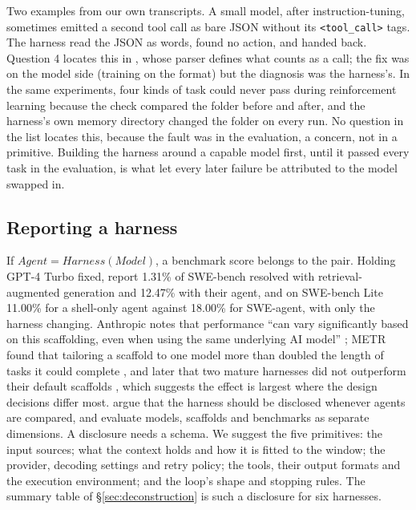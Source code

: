 Two examples from our own transcripts. A small model, after instruction-tuning, sometimes emitted a second tool call as bare JSON without its \texttt{<tool\_call>} tags. The harness read the JSON as words, found no action, and handed back. Question 4 locates this in , whose parser defines what counts as a call; the fix was on the model side (training on the format) but the diagnosis was the harness's. In the same experiments, four kinds of task could never pass during reinforcement learning because the check compared the folder before and after, and the harness's own memory directory changed the folder on every run. No question in the list locates this, because the fault was in the evaluation, a concern, not in a primitive. Building the harness around a capable model first, until it passed every task in the evaluation, is what let every later failure be attributed to the model swapped in.

\subsection{Reporting a harness}
If $\textit{Agent} = \textit{Harness}(\textit{Model})$, a benchmark score belongs to the pair. Holding GPT-4 Turbo fixed, \citet{yang2024sweagent} report 1.31\% of SWE-bench \citep{jimenez2024swebench} resolved with retrieval-augmented generation and 12.47\% with their agent, and on SWE-bench Lite 11.00\% for a shell-only agent against 18.00\% for SWE-agent, with only the harness changing. Anthropic notes that performance ``can vary significantly based on this scaffolding, even when using the same underlying AI model'' \citep{anthropic2025swebench}; METR found that tailoring a scaffold to one model more than doubled the length of tasks it could complete \citep{metr2025update}, and later that two mature harnesses did not outperform their default scaffolds \citep{metr2026harness}, which suggests the effect is largest where the design decisions differ most. \citet{zhang2026stop} argue that the harness should be disclosed whenever agents are compared, and \citet{kapoor2025hal} evaluate models, scaffolds and benchmarks as separate dimensions. A disclosure needs a schema. We suggest the five primitives: the input sources; what the context holds and how it is fitted to the window; the provider, decoding settings and retry policy; the tools, their output formats and the execution environment; and the loop's shape and stopping rules. The summary table of \S\ref{sec:deconstruction} is such a disclosure for six harnesses.

